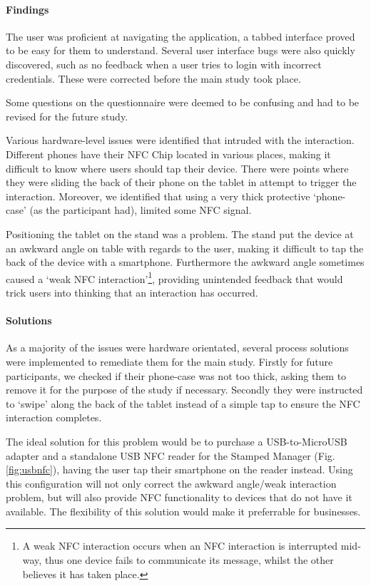 \paragraph{Findings}

The user was proficient at navigating the application, a tabbed interface proved to be easy for them to understand. Several user interface bugs were also quickly discovered, such as no feedback when a user tries to login with incorrect credentials. These were corrected before the main study took place.

Some questions on the questionnaire were deemed to be confusing and had to be revised for the future study. 

Various hardware-level issues were identified that intruded with the interaction. Different phones have their NFC Chip located in various places, making it difficult to know where users should tap their device. There were points where they were sliding the back of their phone on the tablet in attempt to trigger the interaction. Moreover, we identified that using a very thick protective `phone-case' (as the participant had), limited some NFC signal.

Positioning the tablet on the stand was a problem. The stand put the device at an awkward angle on table with regards to the user, making it difficult to tap the back of the device with a smartphone. Furthermore the awkward angle sometimes caused a `weak NFC interaction'\footnote{A weak NFC interaction occurs when an NFC interaction is interrupted mid-way, thus one device fails to communicate its message, whilst the other believes it has taken place.}, providing unintended feedback that would trick users into thinking that an interaction has occurred.

\paragraph{Solutions}

As a majority of the issues were hardware orientated, several process solutions were implemented to remediate them for the main study. Firstly for future participants, we checked if their phone-case was not too thick, asking them to remove it for the purpose of the study if necessary. Secondly they were instructed to `swipe' along the back of the tablet instead of a simple tap to ensure the NFC interaction completes. 

The ideal solution for this problem would be to purchase a USB-to-MicroUSB adapter and a standalone USB NFC reader for the Stamped Manager (Fig. \ref{fig:usbnfc}), having the user tap their smartphone on the reader instead. Using this configuration will not only correct the awkward angle/weak interaction problem, but will also provide NFC functionality to devices that do not have it available.  The flexibility of this solution would make it preferrable for businesses.

